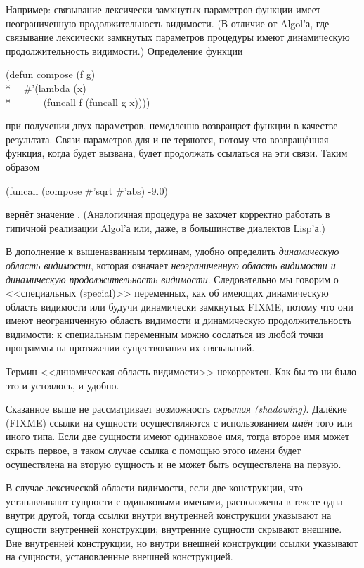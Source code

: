 \begin{itemize}
Например: связывание лексически замкнутых параметров функции имеет неограниченную
продолжительность видимости. (В отличие от Algol'а, где связывание лексически
замкнутых параметров процедуры имеют динамическую продолжительность видимости.)
Определение функции
\begin{lisp}
(defun compose (f g) \\*
~~\#'(lambda (x) \\*
~~~~~~(funcall f (funcall g x))))
\end{lisp}
при получении двух параметров, немедленно возвращает функции в качестве
результата.
Связи параметров для  и  не теряются, потому что возвращённая
функция, когда будет вызвана, будет продолжать ссылаться на эти связи.
Таким образом
\begin{lisp}
(funcall (compose \#'sqrt \#'abs) -9.0)
\end{lisp}
вернёт значение . (Аналогичная процедура не захочет корректно работать в
типичной реализации Algol'а или, даже, в большинстве диалектов Lisp'а.)
\end{itemize}

В дополнение к вышеназванным терминам, удобно определить \emph{динамическую
  область видимости}, которая означает \emph{неограниченную область видимости и
  динамическую продолжительность видимости}. Следовательно мы говорим о
<<специальных (special)>> переменных, как об имеющих динамическую область
видимости или будучи динамически замкнутых FIXME, потому что они имеют
неограниченную область видимости и динамическую продолжительность видимости:
к специальным переменным можно сослаться из любой точки программы на протяжении
существования их связываний.

\begin{newer}
Термин <<динамическая область видимости>> некорректен. Как бы то ни было это и
устоялось, и удобно.
\end{newer}

Сказанное выше не рассматривает возможность \emph{скрытия
  (shadowing)}. Далёкие (FIXME) ссылки на сущности осуществляются с
использованием \emph{имён} того или иного типа. Если две сущности имеют
одинаковое имя, тогда второе имя может скрыть первое, в таком случае ссылка с
помощью этого имени будет осуществлена на вторую сущность и не может быть
осуществлена на первую.

В случае лексической области видимости,
если две конструкции, что устанавливают сущности с одинаковыми именами,
расположены в тексте одна внутри другой, тогда ссылки внутри внутренней
конструкции указывают на сущности внутренней конструкции; внутренние сущности
скрывают внешние. Вне внутренней конструкции, но внутри внешней конструкции
ссылки указывают на сущности, установленные внешней конструкцией.


